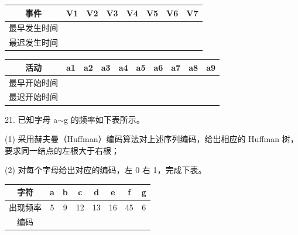 \begin{center}
\begin{tabular}{|c|c|c|c|c|c|c|c|}
\hline
事件 & V1 & V2 & V3 & V4 & V5 & V6 & V7 \\
\hline
最早发生时间 & \phantom{X} & \phantom{X} & \phantom{X} & \phantom{X} & \phantom{X} & \phantom{X} & \phantom{X} \\
\hline
最迟发生时间 & \phantom{X} & \phantom{X} & \phantom{X} & \phantom{X} & \phantom{X} & \phantom{X} & \phantom{X} \\
\hline
\end{tabular}
\end{center}

\vspace{2em}

\begin{center}
\begin{tabular}{|c|c|c|c|c|c|c|c|c|c|}
\hline
活动 & a1 & a2 & a3 & a4 & a5 & a6 & a7 & a8 & a9 \\
\hline
最早开始时间 & \phantom{X} & \phantom{X} & \phantom{X} & \phantom{X} & \phantom{X} & \phantom{X} & \phantom{X} & \phantom{X} & \phantom{X} \\
\hline
最迟开始时间 & \phantom{X} & \phantom{X} & \phantom{X} & \phantom{X} & \phantom{X} & \phantom{X} & \phantom{X} & \phantom{X} & \phantom{X} \\
\hline
\end{tabular}
\end{center}

\vspace{10em}

\newpage

21. 已知字母 a\(\sim\)g 的频率如下表所示。

(1) 采用赫夫曼（Huffman）编码算法对上述序列编码，给出相应的 Huffman 树，要求同一结点的左根大于右根；

(2) 对每个字母给出对应的编码，左 0 右 1，完成下表。

\begin{center}
\begin{tabular}{|c|c|c|c|c|c|c|c|}
\hline
字符 & a & b & c & d & e & f & g \\
\hline
出现频率 & 5 & 9 & 12 & 13 & 16 & 45 & 6 \\
\hline
编码 & \phantom{X} & \phantom{X} & \phantom{X} & \phantom{X} & \phantom{X} & \phantom{X} & \phantom{X} \\
\hline
\end{tabular}
\end{center}

